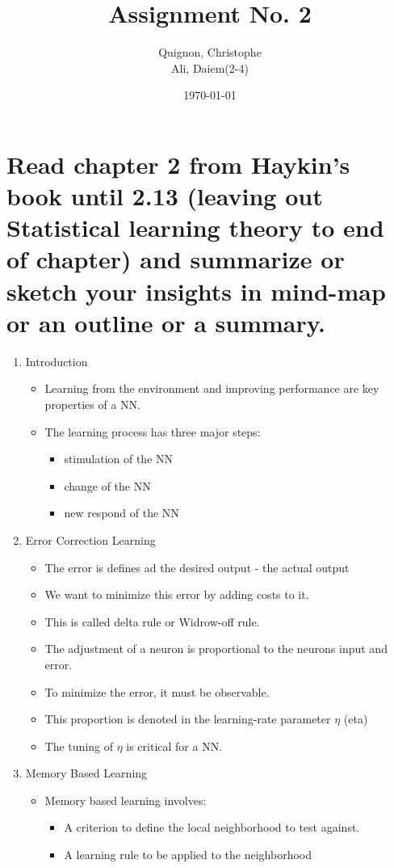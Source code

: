 \documentclass{scrartcl}
\begin{document}
\title{Assignment No. 2}
\subtitle{}
\author{
  Quignon, Christophe \\
 Ali, Daiem(2-4)
} 
\date{\today}


\maketitle

\section{Read chapter 2 from Haykin’s book until 2.13 (leaving out Statistical learning theory to
end of chapter) and summarize or sketch your insights in mind-map or an outline or a
summary.
}
\begin{enumerate}
\item Introduction
	\begin{itemize}
	\item Learning from the environment and improving performance are key properties of a NN.
	\item The learning process has three major steps:
		\begin{itemize}
		\item stimulation of the NN
		\item change of the NN
		\item new respond of the NN
		\end{itemize}
	\end{itemize}
\item Error Correction Learning
	\begin{itemize}
	\item The error is defines ad the desired output - the actual output
	\item We want to minimize this error by adding costs to it. 
	\item This is called delta rule or Widrow-off rule.
	\item The adjustment of a neuron is proportional to the neurons input and error.
	\item To minimize the error, it must be observable.
	\item This proportion is denoted in the learning-rate parameter $\eta$ (eta)
	\item The tuning of $\eta$ is critical for a NN.
	\end{itemize}
\item Memory Based Learning
	\begin{itemize}
	\item Memory based learning involves:
		\begin{itemize}
		\item A criterion to define the local neighborhood to test against.
		\item A learning rule to be applied to the neighborhood
		\end{itemize}
		

\end{itemize}
\end{enumerate}
\end{document}
